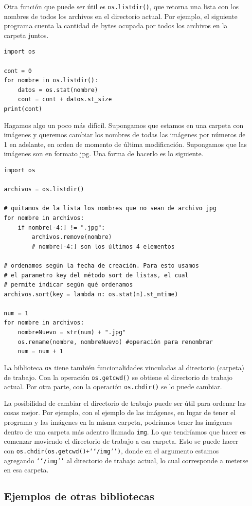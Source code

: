 \documentclass[a4paper, 12pt]{report}
\theoremstyle{definition}
\begin{document}
Otra función que puede ser útil es {\tt os.listdir()}, que retorna una lista con los nombres de todos los archivos en el directorio actual. Por ejemplo, el siguiente programa cuenta la cantidad de bytes ocupada por todos los archivos en la carpeta juntos.
\begin{verbatim}
import os

cont = 0
for nombre in os.listdir():
    datos = os.stat(nombre)
    cont = cont + datos.st_size
print(cont)
\end{verbatim}

Hagamos algo un poco más difícil. Supongamos que estamos en una carpeta con imágenes y queremos cambiar los nombres de todas las imágenes por números de 1 en adelante, en orden de momento de última modificación. Supongamos que las imágenes son en formato jpg. Una forma de hacerlo es lo siguiente.
\begin{verbatim}
import os

archivos = os.listdir()

# quitamos de la lista los nombres que no sean de archivo jpg
for nombre in archivos:
    if nombre[-4:] != ".jpg":
        archivos.remove(nombre)
        # nombre[-4:] son los últimos 4 elementos

# ordenamos según la fecha de creación. Para esto usamos
# el parametro key del método sort de listas, el cual
# permite indicar según qué ordenamos
archivos.sort(key = lambda n: os.stat(n).st_mtime)

num = 1
for nombre in archivos:
    nombreNuevo = str(num) + ".jpg"
    os.rename(nombre, nombreNuevo) #operación para renombrar
    num = num + 1
\end{verbatim}

La biblioteca {\tt os} tiene también funcionalidades vinculadas al directorio (carpeta) de trabajo. Con la operación {\tt os.getcwd()} se obtiene el directorio de trabajo actual. Por otra parte, con la operación {\tt os.chdir()} se lo puede cambiar.

La posibilidad de cambiar el directorio de trabajo puede ser útil para ordenar las cosas mejor. Por ejemplo, con el ejemplo de las imágenes, en lugar de tener el programa y las imágenes en la misma carpeta, podríamos tener las imágenes dentro de una carpeta más adentro llamada {\tt img}. Lo que tendríamos que hacer es comenzar moviendo el directorio de trabajo a esa carpeta. Esto se puede hacer con {\tt os.chdir(os.getcwd()+\lq\lq/img\rq\rq)}, donde en el argumento estamos agregando {\tt \lq\lq/img\rq\rq} al directorio de trabajo actual, lo cual corresponde a meterse en esa carpeta.
\subsection{Ejemplos de otras bibliotecas}
\end{document}
